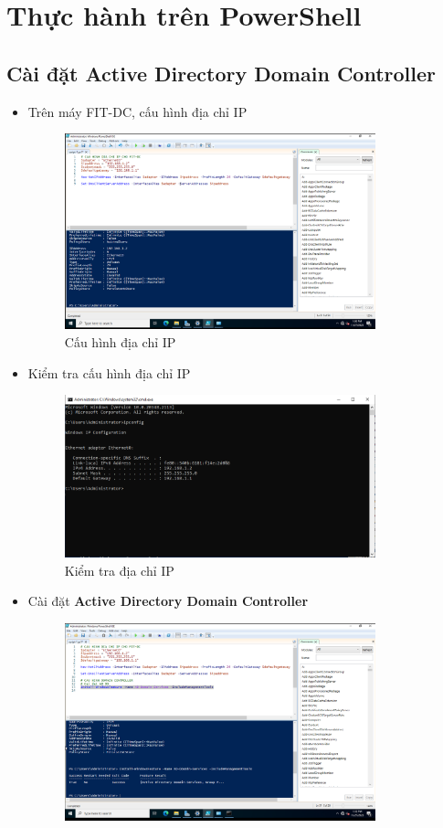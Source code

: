 \documentclass[13pt]{report}
\begin{document}
	\section{Thực hành trên PowerShell}
	\subsection{Cài đặt Active Directory Domain Controller}
	\begin{itemize}
		\item Trên máy FIT-DC, cấu hình địa chỉ IP
		\begin{figure}[htp]
			\centering
			\includegraphics[width=0.85\textwidth]{image/PowerShell/ADDC/1.png}
			\caption{Cấu hình địa chỉ IP}
		\end{figure}
		\item Kiểm tra cấu hình địa chỉ IP
		\begin{figure}[h]
			\centering
			\includegraphics[width=0.85\textwidth]{image/PowerShell/ADDC/2.png}
			\caption{Kiểm tra địa chỉ IP}
		\end{figure}
		\newpage
		\item Cài đặt \textbf{Active Directory Domain Controller}
		\begin{figure}[htp]
			\centering
			\includegraphics[width=0.85\textwidth]{image/PowerShell/ADDC/3.png}

\end{figure}
\end{itemize}
\end{document}

